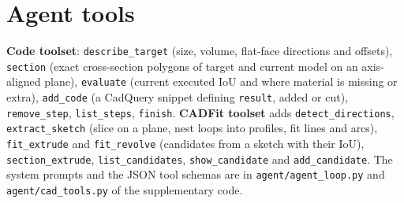 \section{Agent tools}
\label{app:tools}
\textbf{Code toolset}: \texttt{describe\_target} (size, volume, flat-face directions and offsets), \texttt{section} (exact cross-section polygons of target and current model on an axis-aligned plane), \texttt{evaluate} (current executed IoU and where material is missing or extra), \texttt{add\_code} (a CadQuery snippet defining \texttt{result}, added or cut), \texttt{remove\_step}, \texttt{list\_steps}, \texttt{finish}. \textbf{CADFit toolset} adds \texttt{detect\_directions}, \texttt{extract\_sketch} (slice on a plane, nest loops into profiles, fit lines and arcs), \texttt{fit\_extrude} and \texttt{fit\_revolve} (candidates from a sketch with their IoU), \texttt{section\_extrude}, \texttt{list\_candidates}, \texttt{show\_candidate} and \texttt{add\_candidate}. The system prompts and the JSON tool schemas are in \texttt{agent/agent\_loop.py} and \texttt{agent/cad\_tools.py} of the supplementary code.
